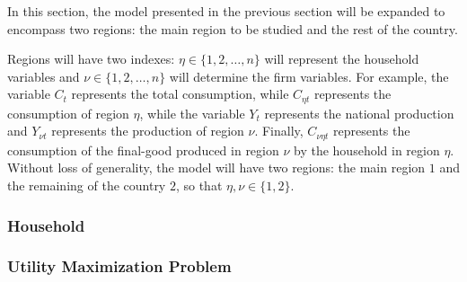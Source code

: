 \documentclass[
	thesis.tex
	]{subfiles}
\begin{document}
In this section, the model presented in the previous section will be expanded to encompass two regions: the main region to be studied and the rest of the country.

Regions will have two indexes: $\eta \in \{1,2,\ldots,n\}$ will represent the household variables and $\nu \in \{1,2,\ldots,n\}$ will determine the firm variables. For example, the variable $C_{t}$ represents the total consumption, while $C_{\eta t}$ represents the consumption of region $\eta$, while the variable $Y_t$ represents the national production and $Y_{\nu t}$ represents the production of region $\nu$. Finally, $C_{\nu\eta t}$ represents the consumption of the final-good produced in region $\nu$ by the household in region $\eta$. Without loss of generality, the model will have two regions: the main region $1$ and the remaining of the country $2$, so that $\eta,\nu \in \{1,2\}$.



\subsubsection{Household}

\subsubsection*{Utility Maximization Problem}
\end{document}
